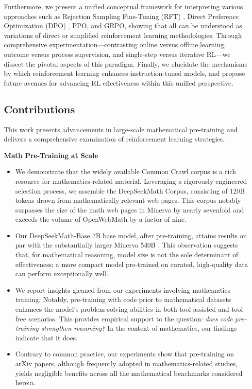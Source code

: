 Furthermore, we present a unified conceptual framework for interpreting various approaches such as Rejection Sampling Fine-Tuning (RFT) \citep{yuan2023scaling}, Direct Preference Optimization (DPO) \citep{dpo}, PPO, and GRPO, showing that all can be understood as variations of direct or simplified reinforcement learning methodologies. Through comprehensive experimentation—contrasting online versus offline learning, outcome versus process supervision, and single-step versus iterative RL—we dissect the pivotal aspects of this paradigm. Finally, we elucidate the mechanisms by which reinforcement learning enhances instruction-tuned models, and propose future avenues for advancing RL effectiveness within this unified perspective.

\subsection{Contributions}
This work presents advancements in large-scale mathematical pre-training and delivers a comprehensive examination of reinforcement learning strategies.

\textbf{Math Pre-Training at Scale}

\begin{itemize}[topsep=0pt]
    \item We demonstrate that the widely available Common Crawl corpus is a rich resource for mathematics-related material. Leveraging a rigorously engineered selection process, we assemble the DeepSeekMath Corpus, consisting of 120B tokens drawn from mathematically relevant web pages. This corpus notably surpasses the size of the math web pages in Minerva \citep{minerva} by nearly sevenfold and exceeds the volume of OpenWebMath \citep{openwebmath} by a factor of nine.

    \item Our DeepSeekMath-Base 7B base model, after pre-training, attains results on par with the substantially larger Minerva 540B \citep{minerva}. This observation suggests that, for mathematical reasoning, model size is not the sole determinant of effectiveness; a more compact model pre-trained on curated, high-quality data can perform exceptionally well.

    \item We report insights gleaned from our experiments involving mathematics training. Notably, pre-training with code prior to mathematical datasets enhances the model’s problem-solving abilities in both tool-assisted and tool-free scenarios. This provides empirical support to the question: \textit{does code pre-training strengthen reasoning?} In the context of mathematics, our findings indicate that it does.

    \item Contrary to common practice, our experiments show that pre-training on arXiv papers, although frequently adopted in mathematics-related studies, yields negligible benefits across all the mathematical benchmarks considered herein.
\end{itemize}

